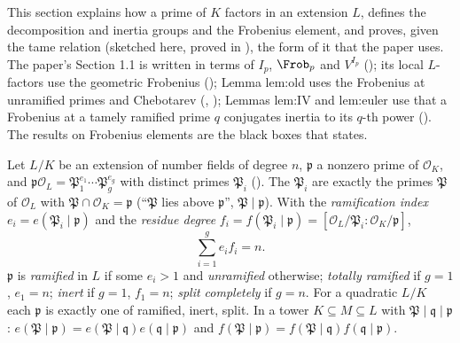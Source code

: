 This section explains how a prime of $K$ factors in an extension $L$, defines the decomposition and inertia groups and the Frobenius element,
and proves, given the tame relation (sketched here, proved in ), the form of it that the paper uses. The paper's Section 1.1 is written in terms of $I_p$, $\Frob_p$ and
$V^{I_p}$ (); its local $L$-factors use the geometric Frobenius (); Lemma lem:old uses the
Frobenius at unramified primes and Chebotarev (, ); Lemmas lem:IV and lem:euler use that
a Frobenius at a tamely ramified prime $q$ conjugates inertia to its $q$-th power (). The results on Frobenius elements
are the black boxes that  states.

\begin{theorem}[$\sum e_if_i=n$]\label{thm:ant:efg}
Let $L/K$ be an extension of number fields of degree $n$, $\mathfrak p$ a nonzero prime of $\mathcal O_K$, and $\mathfrak p\mathcal O_L=
\mathfrak P_1^{e_1}\cdots\mathfrak P_g^{e_g}$ with distinct primes $\mathfrak P_i$ (). The $\mathfrak P_i$ are exactly the
primes $\mathfrak P$ of $\mathcal O_L$ with $\mathfrak P\cap\mathcal O_K=\mathfrak p$ (``$\mathfrak P$ lies above $\mathfrak p$'', $\mathfrak P\mid\mathfrak p$). With the
\emph{ramification index} $e_i=e(\mathfrak P_i\mid\mathfrak p)$ and the \emph{residue degree} $f_i=f(\mathfrak P_i\mid\mathfrak p)=[\mathcal O_L/\mathfrak P_i:
\mathcal O_K/\mathfrak p]$,
\[
\sum_{i=1}^ge_if_i=n.
\]
$\mathfrak p$ is \emph{ramified} in $L$ if some $e_i>1$ and \emph{unramified} otherwise; \emph{totally ramified} if $g=1$, $e_1=n$; \emph{inert} if
$g=1$, $f_1=n$; \emph{split completely} if $g=n$. For a quadratic $L/K$ each $\mathfrak p$ is exactly one of ramified, inert, split. In a tower
$K\subseteq M\subseteq L$ with $\mathfrak P\mid\mathfrak q\mid\mathfrak p$: $e(\mathfrak P\mid\mathfrak p)=e(\mathfrak P\mid\mathfrak q)e(\mathfrak q\mid\mathfrak p)$ and
$f(\mathfrak P\mid\mathfrak p)=f(\mathfrak P\mid\mathfrak q)f(\mathfrak q\mid\mathfrak p)$.
\end{theorem}

